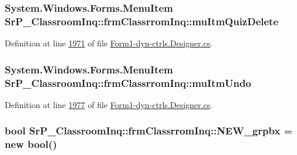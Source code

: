 \hypertarget{class_sr_p___classroom_inq_1_1frm_classrrom_inq_a2d03550cfd9c6e91732a9a669089cb48}{
\subsubsection[{mu\-Itm\-Quiz\-Delete}]{\setlength{\rightskip}{0pt plus 5cm}\-System.\-Windows.\-Forms.\-Menu\-Item {\bf \-Sr\-P\-\_\-\-Classroom\-Inq\-::frm\-Classrrom\-Inq\-::mu\-Itm\-Quiz\-Delete}}}
\label{class_sr_p___classroom_inq_1_1frm_classrrom_inq_a2d03550cfd9c6e91732a9a669089cb48}


\-Definition at line \hyperlink{_form1-dyn-ctrls_8_designer_8cs_source_l01971}{1971} of file \hyperlink{_form1-dyn-ctrls_8_designer_8cs_source}{\-Form1-\/dyn-\/ctrls.\-Designer.\-cs}.

\hypertarget{class_sr_p___classroom_inq_1_1frm_classrrom_inq_aa3e4ca1c9b69ec8008d53de0a7727b9f}{
\subsubsection[{mu\-Itm\-Undo}]{\setlength{\rightskip}{0pt plus 5cm}\-System.\-Windows.\-Forms.\-Menu\-Item {\bf \-Sr\-P\-\_\-\-Classroom\-Inq\-::frm\-Classrrom\-Inq\-::mu\-Itm\-Undo}}}
\label{class_sr_p___classroom_inq_1_1frm_classrrom_inq_aa3e4ca1c9b69ec8008d53de0a7727b9f}


\-Definition at line \hyperlink{_form1-dyn-ctrls_8_designer_8cs_source_l01977}{1977} of file \hyperlink{_form1-dyn-ctrls_8_designer_8cs_source}{\-Form1-\/dyn-\/ctrls.\-Designer.\-cs}.

\hypertarget{class_sr_p___classroom_inq_1_1frm_classrrom_inq_aaf5a152b29ae06c11e8e25f0eabf454d}{
\subsubsection[{\-N\-E\-W\-\_\-grpbx}]{\setlength{\rightskip}{0pt plus 5cm}bool {\bf \-Sr\-P\-\_\-\-Classroom\-Inq\-::frm\-Classrrom\-Inq\-::\-N\-E\-W\-\_\-grpbx} = new bool()}}
\label{class_sr_p___classroom_inq_1_1frm_classrrom_inq_aaf5a152b29ae06c11e8e25f0eabf454d}


